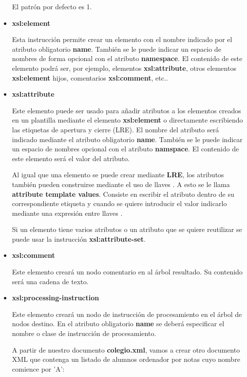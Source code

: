 \begin{itemize}
    El patrón por defecto es 1.

    \item \textbf{xsl:element}

    Esta instrucción permite crear un elemento con el nombre indicado por el atributo obligatorio \textbf{name}. También se le puede indicar un espacio de nombres de forma opcional con el atributo \textbf{namespace}. El contenido de este elemento podrá ser, por ejemplo, elementos \textbf{xsl:attribute}, otros elementos \textbf{xsl:element} hijos, comentarios \textbf{xsl:comment}, etc..

    \item \textbf{xsl:attribute}

    Este elemento puede ser usado para añadir atributos a los elementos creados en un plantilla mediante el elemento \textbf{xsl:element} o directamente escribiendo las etiquetas de apertura y cierre (LRE). El nombre del atributo será indicado mediante el atributo obligatorio \textbf{name}. También se le puede indicar un espacio de nombres opcional con el atributo \textbf{namspace}. El contenido de este elemento será el valor del atributo.

    Al igual que una elemento se puede crear mediante \textbf{LRE}, los atributos también pueden construirse mediante el uso de llaves \textbf{{}}. A esto se le llama \textbf{attribute template values}. Consiste en escribir el atributo dentro de su correspondiente etiqueta y cuando se quiere introducir el valor indicarlo mediante una expresión entre llaves {}.

    Si un elemento tiene varios atributos o un atributo que se quiere reutilizar se puede usar la instrucción \textbf{xsl:attribute-set}.

    \item \textbf{xsl:comment}

    Este elemento creará un nodo comentario en al árbol resultado. Su contenido será una cadena de texto.

    \item \textbf{xsl:processing-instruction}

    Este elemento creará un nodo de instrucción de procesamiento en el árbol de nodos  destino. En el atributo obligatorio \textbf{name} se deberá especificar el nombre o clase de instrucción de procesamiento.

    A partir de nuestro documento \textbf{colegio.xml}, vamos a crear otro documento XML que contenga un listado de alumnos ordenador por notas cuyo nombre comience por 'A':


\end{itemize}
